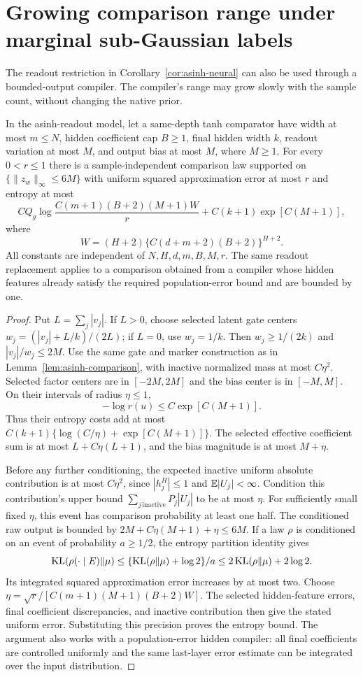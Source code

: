 \section{Growing comparison range under marginal sub-Gaussian labels}
\label{sec:asinh-growing-range}
The readout restriction in Corollary~\ref{cor:asinh-neural} can also be
used through a bounded-output compiler. The compiler's range may grow
slowly with the sample count, without changing the native prior.

\begin{lemma}
\label{lem:asinh-growing-comparison}
In the asinh-readout model, let a same-depth tanh comparator have
width at most $m\le N$, hidden coefficient cap $B\ge1$, final hidden
width $k$, readout variation at most $M$, and output bias at most $M$,
where $M\ge1$. For every $0<r\le1$ there is a sample-independent
comparison law supported on $\{\|z_w\|_\infty\le6M\}$ with
uniform squared approximation error at most $r$ and entropy at most
\[
 C Q_g\log\frac{C(m+1)(B+2)(M+1)W}{r}
             +C(k+1)\exp[C(M+1)],
\]
where
\[
 W=(H+2)\{C(d+m+2)(B+2)\}^{H+2}.
\]
All constants are independent of $N,H,d,m,B,M,r$.
The same readout replacement applies to a comparison obtained from a
compiler whose hidden features already satisfy the required
population-error bound and are bounded by one.
\end{lemma}
\begin{proof}
Put $L=\sum_j|v_j|$. If $L>0$, choose selected latent gate centers
$w_j=(|v_j|+L/k)/(2L)$; if $L=0$, use $w_j=1/k$.
Then $w_j\ge1/(2k)$ and $|v_j|/w_j\le2M$.
Use the same gate and marker construction as in
Lemma~\ref{lem:asinh-comparison}, with inactive normalized mass at
most $C\eta^2$. Selected factor centers are in $[-2M,2M]$ and the
bias center is in $[-M,M]$. On their intervals of radius $\eta\le1$,
\[
 -\log r(u)\le C\exp[C(M+1)].
\]
Thus their entropy costs add at most
$C(k+1)\{\log(C/\eta)+\exp[C(M+1)]\}$.
The selected effective coefficient sum is at most
$L+C\eta(L+1)$, and the bias magnitude is at most $M+\eta$.

Before any further conditioning, the expected inactive uniform
absolute contribution is at most $C\eta^2$, since
$|h_j^H|\le1$ and $\mathbb E|U_j|<\infty$.
Condition this contribution's upper bound
$\sum_{j\,\mathrm{inactive}}P_j|U_j|$ to be at most $\eta$.
For sufficiently small fixed $\eta$, this event has comparison
probability at least one half. The conditioned raw output is bounded
by $2M+C\eta(M+1)+\eta\le6M$.
If a law $\rho$ is conditioned on an event of probability $a\ge1/2$,
the entropy partition identity gives
\[
 \operatorname{KL}(\rho(\cdot\mid E)\|\mu)
 \le\{\operatorname{KL}(\rho\|\mu)+\log2\}/a
 \le2\operatorname{KL}(\rho\|\mu)+2\log2.
\]
Its integrated squared approximation error increases by at most two.
Choose $\eta=\sqrt r/[C(m+1)(M+1)(B+2)W]$.
The selected hidden-feature errors, final coefficient discrepancies,
and inactive contribution then give the stated uniform error.
Substituting this precision proves the entropy bound. The argument
also works with a population-error hidden compiler: all final
coefficients are controlled uniformly and the same last-layer error
estimate can be integrated over the input distribution.
\end{proof}

